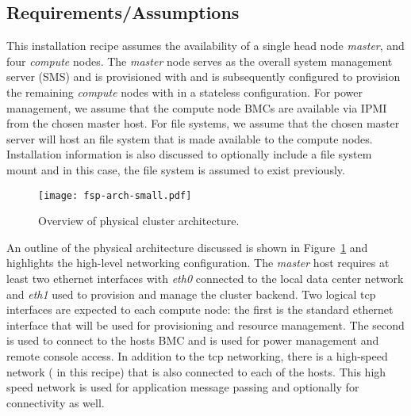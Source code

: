 \subsection{Requirements/Assumptions}
This installation recipe assumes the availability of a single head node {\em
master}, and four {\em compute} nodes. The {\em master} node serves as the
overall system management server (SMS) and is provisioned with \baseOS{} and is
subsequently configured to provision the remaining {\em compute} nodes with
\Warewulf{} in a stateless configuration. For power management, we assume that the
compute node BMCs are available via IPMI from the chosen master host. For file
systems, we assume that the chosen master server will host an \NFS{} file
system that is made available to the compute nodes. Installation information is
also discussed to optionally include a \Lustre{} file system mount and in this
case, the \Lustre{} file system is assumed to exist previously. 

\begin{figure}[hbt]
\center
\texttt{[image: fsp-arch-small.pdf]}
\vspace*{-0.2cm}
\caption{Overview of physical cluster architecture.} \label{fig:physical_arch}
\end{figure}
\mbox{}

An outline of the physical architecture discussed is shown in
Figure~\ref{fig:physical_arch} and highlights the high-level networking
configuration. The {\em master} host requires at least two ethernet interfaces
with {\em eth0} connected to the local data center network and {\em eth1} used
to provision and manage the cluster backend.  Two logical tcp interfaces are
expected to each compute node: the first is the standard ethernet interface
that will be used for provisioning and resource management. The second is used
to connect to the hosts BMC and is used for power management and remote console
access.  In addition to the tcp networking, there is a high-speed network
(\InfiniBand{} in this recipe) that is also connected to each of the
hosts. This high speed network is used for application message passing and
optionally for \Lustre{} connectivity as well.

